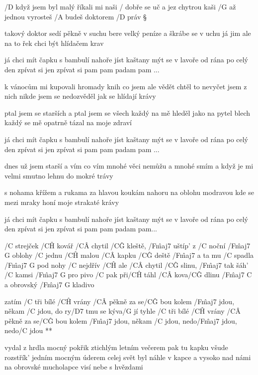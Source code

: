 
/D když jsem byl malý říkali mi naši
/ dobře se uč a jez chytrou kaši
/G až jednou vyrosteš /A budeš doktorem /D práv \S

takový doktor sedí pěkně v suchu
bere velký peníze a škrábe se v uchu
já jim ale na to řek chci být hlídačem krav \s

já chci mít čapku s bambulí nahoře
jíst kaštany mýt se v lavoře
od rána po celý den
zpívat si jen
zpívat si pam pam padam pam ... \s

k vánocům mi kupovali hromady knih
co jsem ale vědět chtěl to nevyčet jsem z nich
nikde jsem se nedozvěděl jak se hlídají krávy \s

ptal jsem se starších a ptal jsem se všech
každý na mě hleděl jako na pytel blech
každý se mě opatrně tázal na moje zdraví \s

já chci mít čapku s bambulí nahoře
jíst kaštany mýt se v lavoře
od rána po celý den
zpívat si jen
zpívat si pam pam padam pam ... \s

dnes už jsem starší a vím co vím
mnohé věci nemůžu a mnohé smím
a když je mi velmi smutno lehnu do mokré trávy \s

s nohama křížem a rukama za hlavou
koukám nahoru na oblohu modravou
kde se mezi mraky honí moje strakaté krávy \s

já chci mít čapku s bambulí nahoře
jíst kaštany mýt se v lavoře
od rána po celý den
zpívat si jen
zpívat si pam pam padam pam...




/C strejček /C\^H kovář /C\^A chytil /C\^G kleště, /F\^{maj7} uštíp' z /C noční /{F\^{maj7} G} oblohy
/C jednu /C\^H malou /C\^A kapku /C\^G deště /F\^{maj7} a ta mu /C spadla /{F\^{maj7} G} pod nohy
/C nejdřív /C\^H ale /C\^A chytil /C\^G slinu, /F\^{maj7} tak šáh' /C kamsi /{F\^{maj7} G} pro pivo
/C pak při/C\^H táhl /C\^A kova/C\^G dlinu /{F\^{maj7} C} a obrovský /{F\^{maj7} G} kladivo

\R  zatím /C tři bílé /C\^H vrány /C\^A pěkně za se/C\^G bou
    kolem /F\^{maj7} jdou, někam /C jdou, do ry/D7 tmu se kýva/G jí
    tyhle /C tři bílé /C\^H vrány /C\^A pěkně za se/C\^G bou
    kolem /F\^{maj7} jdou, někam /C jdou, nedo/F\^{maj7} jdou, nedo/C jdou **

vydal z hrdla mocný pokřik ztichlým letním večerem
pak tu kapku všude rozstřík' jedním mocným úderem
celej svět byl náhle v kapce a vysoko nad námi
na obrovské mucholapce visí nebe s hvězdami

